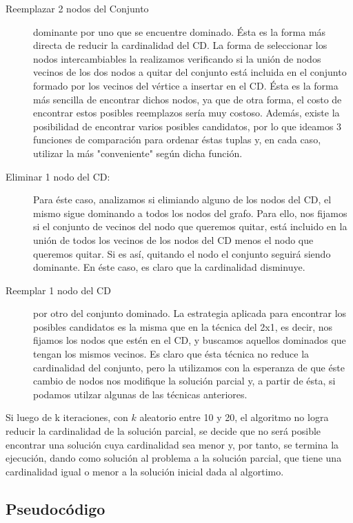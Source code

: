 \begin{description}
\item[Reemplazar 2 nodos del Conjunto] dominante por uno que se encuentre dominado. Ésta es la forma más directa de reducir la cardinalidad del CD. La forma de seleccionar los nodos intercambiables la realizamos verificando si la unión de nodos vecinos de los dos nodos a quitar del conjunto está incluida en el conjunto formado por los vecinos del vértice a insertar en el CD. Ésta es la forma más sencilla de encontrar dichos nodos, ya que de otra forma, el costo de encontrar estos posibles reemplazos sería muy costoso. Además, existe la posibilidad de encontrar varios posibles candidatos, por lo que ideamos 3 funciones de comparación para ordenar éstas tuplas y, en cada caso, utilizar la más "conveniente" según dicha función.
\item[Eliminar 1 nodo del CD:] Para éste caso, analizamos si elimiando alguno de los nodos del CD, el mismo sigue dominando a todos los nodos del grafo. Para ello, nos fijamos si el conjunto de vecinos del nodo que queremos quitar, está incluido en la unión de todos los vecinos de los nodos del CD menos el nodo que queremos quitar. Si es así, quitando el nodo el conjunto seguirá siendo dominante. En éste caso, es claro que la cardinalidad disminuye.
\item[Reemplar 1 nodo del CD] por otro del conjunto dominado. La estrategia aplicada para encontrar los posibles candidatos es la misma que en la técnica del 2x1, es decir, nos fijamos los nodos que estén en el CD, y buscamos aquellos dominados que tengan los mismos vecinos. Es claro que ésta técnica no reduce la cardinalidad del conjunto, pero la utilizamos con la esperanza de que éste cambio de nodos nos modifique la solución parcial y, a partir de ésta, si podamos utilzar algunas de las técnicas anteriores.
\end{description}

Si luego de k iteraciones, con $k$ aleatorio entre 10 y 20, el algoritmo no logra reducir la cardinalidad de la solución parcial, se decide que no será posible encontrar una solución cuya cardinalidad sea menor y, por tanto, se termina la ejecución, dando como solución al problema a la solución parcial, que tiene una cardinalidad igual o menor a la solución inicial dada al algortimo.

\subsection{Pseudocódigo}

